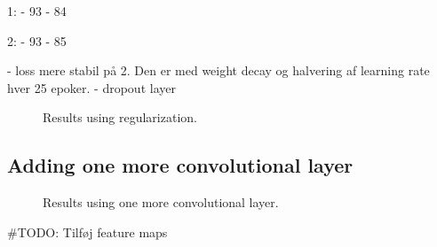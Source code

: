 1:
- 93%
- 84%

2:
- 93%
- 85%

- loss mere stabil på 2. Den er med weight decay og halvering af learning rate hver 25 epoker.
- dropout layer

\begin{figure}[H]
    \vspace*{-0.7cm}
    \centering
    \hspace{1cm}
    \caption{Results using regularization.}
    \label{fig:reg}
    \vspace*{-0.7cm}
\end{figure}

\subsection{Adding one more convolutional layer}
\begin{figure}[H]
    \vspace*{-0.7cm}
    \centering
    \hspace{1cm}
    \caption{Results using one more convolutional layer.}
    \label{fig:reg}
    \vspace*{-0.7cm}
\end{figure}

\#TODO: Tilføj feature maps
